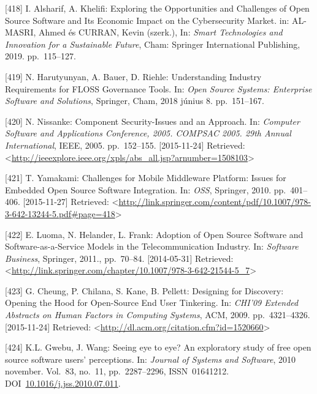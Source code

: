 \documentclass[12pt,magyar,a4paper,oneside]{scrreprt}
\newenvironment{cslreferences}%
  {}%
  {\par}
\begin{document}
\begin{cslreferences}
\leavevmode\hypertarget{ref-alsharif_exploring_2019}{}%
{[}418{]} I. Alsharif, A. Khelifi: Exploring the Opportunities and
Challenges of Open Source Software and Its Economic Impact on the
Cybersecurity Market. in: AL-MASRI, Ahmed és CURRAN, Kevin (szerk.), In:
\emph{Smart Technologies and Innovation for a Sustainable Future}, Cham:
Springer International Publishing, 2019. pp.~115--127.

\leavevmode\hypertarget{ref-harutyunyan_understanding_2018}{}%
{[}419{]} N. Harutyunyan, A. Bauer, D. Riehle: Understanding Industry
Requirements for FLOSS Governance Tools. In: \emph{Open Source Systems:
Enterprise Software and Solutions}, Springer, Cham, 2018 június 8.
pp.~151--167.

\leavevmode\hypertarget{ref-nissanke_component_2005}{}%
{[}420{]} N. Nissanke: Component Security-Issues and an Approach. In:
\emph{Computer Software and Applications Conference, 2005. COMPSAC 2005.
29th Annual International}, IEEE, 2005. pp.~152--155. {[}2015-11-24{]}
Retrieved:
\textless{}\url{http://ieeexplore.ieee.org/xpls/abs_all.jsp?arnumber=1508103}\textgreater{}

\leavevmode\hypertarget{ref-yamakami_challenges_2010}{}%
{[}421{]} T. Yamakami: Challenges for Mobile Middleware Platform: Issues
for Embedded Open Source Software Integration. In: \emph{OSS}, Springer,
2010. pp.~401--406. {[}2015-11-27{]} Retrieved:
\textless{}\url{http://link.springer.com/content/pdf/10.1007/978-3-642-13244-5.pdf\#page=418}\textgreater{}

\leavevmode\hypertarget{ref-luoma_adoption_2011}{}%
{[}422{]} E. Luoma, N. Helander, L. Frank: Adoption of Open Source
Software and Software-as-a-Service Models in the Telecommunication
Industry. In: \emph{Software Business}, Springer, 2011., pp.~70--84.
{[}2014-05-31{]} Retrieved:
\textless{}\url{http://link.springer.com/chapter/10.1007/978-3-642-21544-5_7}\textgreater{}

\leavevmode\hypertarget{ref-cheung_designing_2009}{}%
{[}423{]} G. Cheung, P. Chilana, S. Kane, B. Pellett: Designing for
Discovery: Opening the Hood for Open-Source End User Tinkering. In:
\emph{CHI'09 Extended Abstracts on Human Factors in Computing Systems},
ACM, 2009. pp.~4321--4326. {[}2015-11-24{]} Retrieved:
\textless{}\url{http://dl.acm.org/citation.cfm?id=1520660}\textgreater{}

\leavevmode\hypertarget{ref-gwebu_seeing_2010}{}%
{[}424{]} K.L. Gwebu, J. Wang: Seeing eye to eye? An exploratory study
of free open source software users' perceptions. In: \emph{Journal of
Systems and Software}, 2010 november. Vol.~83, no.~11, pp.~2287--2296,
ISSN~01641212.
DOI~\href{https://doi.org/10.1016/j.jss.2010.07.011}{10.1016/j.jss.2010.07.011}.


\end{cslreferences}
\end{document}
